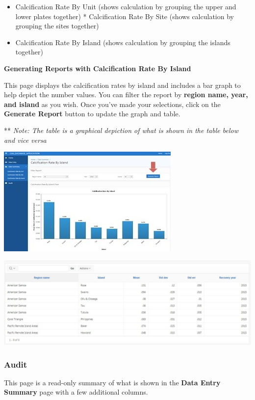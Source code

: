 \documentclass[]{book}
\providecommand{\tightlist}{%
  \setlength{\itemsep}{0pt}\setlength{\parskip}{0pt}}
\begin{document}
\begin{itemize}
\tightlist
\item
  Calcification Rate By Unit (shows calculation by grouping the upper and lower plates together) * Calcification Rate By Site (shows calculation by grouping the sites together)\\
\item
  Calcification Rate By Island (shows calculation by grouping the islands together)
\end{itemize}

\textbf{Generating Reports with Calcification Rate By Island}

This page displays the calcification rates by island and includes a bar graph to help depict the number values. You can filter the report by \textbf{region name, year, and island} as you wish. Once you've made your selections, click on the \textbf{Generate Report} button to update the graph and table.

** \emph{Note: The table is a graphical depiction of what is shown in the table below and vice versa}

\includegraphics{images/Data8.jpg}

\includegraphics{images/Data9.jpg}

\hypertarget{audit}{%
\subsubsection{Audit}\label{audit}}

This page is a read-only summary of what is shown in the \textbf{Data Entry Summary} page with a few additional columns.
\end{document}
